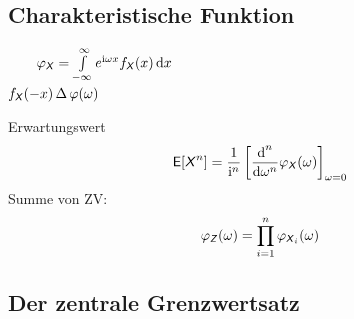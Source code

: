 \documentclass[german,color,6pt]{latex4ei/latex4ei_sheet}
\begin{document}
\begin{sectionbox}
	\subsection{Charakteristische Funktion} %
	\label{sub:charakteristische_funktion}
	 $\qquad \varphi_{\X} = \int\limits_{-\infty}^\infty e^{\i\omega x} f_{\X}(x) \diff x$\\
	$f_{\operatorname{\textsf{\textit{X}}}}(-x) \operatorname{\Delta} \varphi(\omega)$
	
	Erwartungswert
	\begin{eqnarray*}
		\E[\X^n] = \frac{1}{\i^n} \left[\frac{\diff^n}{\diff \omega^n} \varphi_{\X}(\omega)\right]_{\omega = 0}
	\end{eqnarray*}
	Summe von ZV:
	\begin{eqnarray*}
		\varphi_{\operatorname{\textsf{\textit{Z}}}} (\omega) = \prod_{i=1}^{n} \varphi_{\operatorname{\textsf{\textit{X}}}_i} (\omega)
	\end{eqnarray*}
\end{sectionbox}	

\begin{sectionbox}
	\subsection{Der zentrale Grenzwertsatz} %
	\label{sub:der_zentrale_grenzwertsatz}
\end{sectionbox}	

\end{document}
